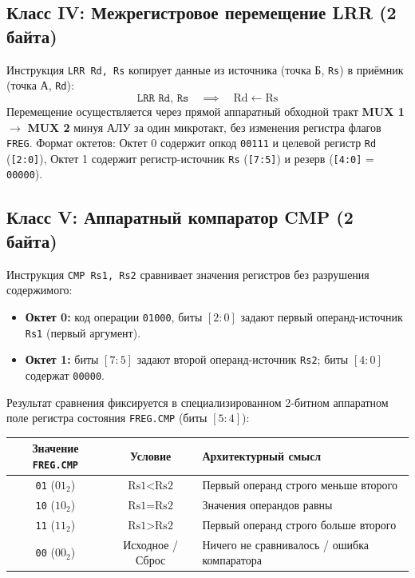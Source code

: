 \documentclass[11pt,a4paper]{article}
\newcommand{\reg}[1]{\texttt{#1}}
\newcommand{\bits}[1]{\texttt{#1}}
\begin{document}
\subsection{Класс IV: Межрегистровое перемещение LRR (2 байта)}
Инструкция \texttt{LRR Rd, Rs} копирует данные из источника (точка Б, \reg{Rs}) в приёмник (точка А, \reg{Rd}):
$$\texttt{LRR Rd, Rs} \quad \implies \quad \text{Rd} \leftarrow \text{Rs}$$
Перемещение осуществляется через прямой аппаратный обходной тракт \textbf{MUX 1} $\to$ \textbf{MUX 2} минуя АЛУ за один микротакт, без изменения регистра флагов \reg{FREG}. Формат октетов: Октет 0 содержит опкод \bits{00111} и целевой регистр \reg{Rd} (\bits{[2:0]}), Октет 1 содержит регистр-источник \reg{Rs} (\bits{[7:5]}) и резерв (\bits{[4:0]} = \bits{00000}).

\subsection{Класс V: Аппаратный компаратор CMP (2 байта)}
Инструкция \texttt{CMP Rs1, Rs2} сравнивает значения регистров без разрушения содержимого:
\begin{itemize}
  \item \textbf{Октет 0:} код операции \bits{01000}, биты $[2:0]$ задают первый операнд-источник \reg{Rs1} (первый аргумент).
  \item \textbf{Октет 1:} биты $[7:5]$ задают второй операнд-источник \reg{Rs2}; биты $[4:0]$ содержат \bits{00000}.
\end{itemize}
Результат сравнения фиксируется в специализированном 2-битном аппаратном поле регистра состояния \reg{FREG.CMP} (биты $[5:4]$):
\begin{center}
\begin{tabular}{ccl}
\toprule
Значение \reg{FREG.CMP} & Условие & Архитектурный смысл \\
\midrule
\texttt{01} ($01_2$) & $\text{Rs1} < \text{Rs2}$ & Первый операнд строго меньше второго \\
\texttt{10} ($10_2$) & $\text{Rs1} = \text{Rs2}$ & Значения операндов равны \\
\texttt{11} ($11_2$) & $\text{Rs1} > \text{Rs2}$ & Первый операнд строго больше второго \\
\texttt{00} ($00_2$) & Исходное / Сброс & Ничего не сравнивалось / ошибка компаратора \\
\bottomrule
\end{tabular}
\end{center}
\end{document}
